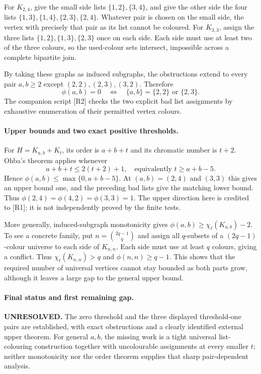 \documentclass[11pt,a4paper]{article}
\begin{document}
For $K_{2,4}$, give the small side lists $\{1,2\},\{3,4\}$,
and give the other side the four lists $\{1,3\},\{1,4\},\{2,3\},
\{2,4\}$. Whatever pair is chosen on the small side, the vertex
with precisely that pair as its list cannot be coloured.
For $K_{3,3}$, assign the three lists $\{1,2\},\{1,3\},\{2,3\}$
once on each side. Each side must use at least two of the three
colours, so the used-colour sets intersect, impossible across a complete
bipartite join.

By taking these graphs as induced subgraphs, the obstructions extend
to every pair $a,b\ge2$ except $(2,2),(2,3),(3,2)$. Therefore
\[
 \phi(a,b)=0\quad\Longleftrightarrow\quad
 \{a,b\}=\{2,2\}\text{ or }\{2,3\}.
\]
The companion script [R2] checks the two explicit bad list assignments
by exhaustive enumeration of their permitted vertex colours.

\paragraph{Upper bounds and two exact positive thresholds.}
For $H=K_{a,b}+K_t$, its order is $a+b+t$ and its chromatic
number is $t+2$. Ohba's theorem applies whenever
\[
 a+b+t\le2(t+2)+1,
 \quad\text{equivalently }t\ge a+b-5.
\]
Hence $\phi(a,b)\le\max\{0,a+b-5\}$. At $(a,b)=(2,4)$
and $(3,3)$ this gives an upper bound one, and the preceding bad
lists give the matching lower bound. Thus
$\phi(2,4)=\phi(4,2)=\phi(3,3)=1$. The upper direction here is
credited to [R1]; it is not independently proved by the finite tests.

More generally, induced-subgraph monotonicity gives
$\phi(a,b)\ge\chi_\ell(K_{a,b})-2$. To see a concrete family,
put $n=\binom{2q-1}{q}$ and assign all $q$-subsets of a
$(2q-1)$-colour universe to each side of $K_{n,n}$. Each side
must use at least $q$ colours, giving a conflict. Thus
$\chi_\ell(K_{n,n})>q$ and $\phi(n,n)\ge q-1$. This shows
that the required number of universal vertices cannot stay bounded
as both parts grow, although it leaves a large gap to the general
upper bound.

\paragraph{Final status and first remaining gap.}
\textbf{UNRESOLVED.} The zero threshold and the three displayed
threshold-one pairs are established, with exact obstructions and a
clearly identified external upper theorem. For general $a,b$, the
missing work is a tight universal list-colouring construction together
with uncolourable assignments at every smaller $t$; neither monotonicity
nor the order theorem supplies that sharp pair-dependent analysis.
\end{document}
